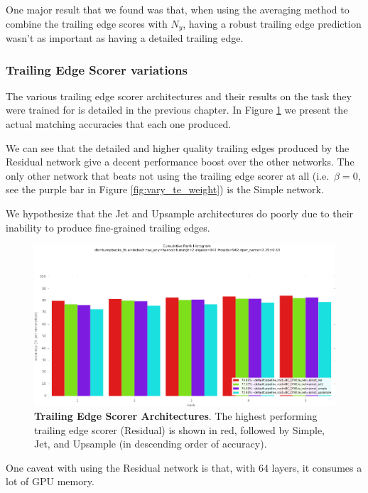 One major result that we found was that, when using the averaging method to combine the trailing edge scores with $N_y$, having a robust trailing edge prediction wasn't as important as having a detailed trailing edge.


\subsubsection{Trailing Edge Scorer variations}

The various trailing edge scorer architectures and their results on the task they were trained for is detailed in the previous chapter.
In Figure \ref{fig:vary_te_scorer} we present the actual matching accuracies that each one produced.

We can see that the detailed and higher quality trailing edges produced by the Residual network give a decent performance boost over the other networks.
The only other network that beats not using the trailing edge scorer at all (i.e.\ $\beta = 0$, see the purple bar in Figure \ref{fig:vary_te_weight}) is the Simple network.

We hypothesize that the Jet and Upsample architectures do poorly due to their inability to produce fine-grained trailing edges. %

\begin{figure}[t]%
\centering
\includegraphics[width=1\textwidth]{../images/results/vary_te_scorer.png}
\caption[]{\textbf{Trailing Edge Scorer Architectures}. The highest performing trailing edge scorer (Residual) is shown in red, followed by Simple, Jet, and Upsample (in descending order of accuracy).}
\label{fig:vary_te_scorer}
\end{figure}

One caveat with using the Residual network is that, with 64 layers, it consumes a lot of GPU memory.

